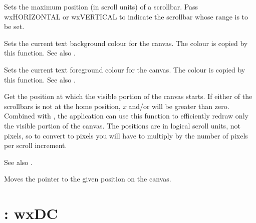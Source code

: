 \label{wxcanvassetscrollrange}


Sets the maximum position (in scroll units) of a scrollbar. Pass wxHORIZONTAL or wxVERTICAL
to indicate the scrollbar whose range is to be set.

\label{wxcanvassettextbackground}


Sets the current text background colour for the canvas. The colour is
copied by this function. See also .

\label{wxcanvassettextforeground}


Sets the current text foreground colour for the canvas. The colour is
copied by this function. See also .



Get the position at which the visible portion of the canvas starts. If
either of the scrollbars is not at the home position, {\it x} and/or
 will be greater than zero.  Combined with ,
the application can use this function to efficiently redraw only the
visible portion of the canvas.  The positions are in logical scroll
units, not pixels, so to convert to pixels you will have to multiply
by the number of pixels per scroll increment.

See also .



Moves the pointer to the given position on the canvas.

\section{: wxDC}\label{wxcanvasdc}

